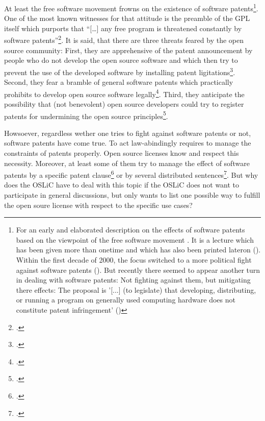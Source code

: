 At least the free software movement frowns on the existence of software
patents\footnote{For an early and elaborated description on the effects of
software patents based on the viewpoint of the free software movement
\cite[see][\nopage wp]{Stallman2001a}. It is a lecture which has been given more
than onetime and which has also been printed lateron (\cite[cf.][\nopage
wp]{Stallman2002a}). Within the first decade of 2000, the focus switched to a
more political fight against software patents (\cite[cf.][\nopage
wp]{Stallman2004a}). But recently there seemed to appear another turn in dealing
with software patents: Not fighting against them, but mitigating there effects:
The proposal is '[...] (to legislate) that developing, distributing, or running
a program on generally used computing hardware does not constitute patent
infringement' (\cite[cf.][\nowpage wp]{Stallman2012a})}. One of the most known
witnesses for that attitude is the preamble of the GPL itself which purports
that \enquote{[\ldots] any free program is threatened constantly by software
patents}\footcite[cf.][wp]{Gpl20OsiLicense1991a}. It is said, that there are
three threats feared by the open source community: First, they are apprehensive
of the patent announcement by people who do not develop the open source software
and which then try to prevent the use of the developed software by installing
patent ligitations\footcite[cf.][234]{JaeMet2011a}. Second, they fear a bramble
of general software patents which practically prohibits to develop open source
software  legally\footcite[cf.][234]{JaeMet2011a}. Third, they anticipate the
possibility that (not benevolent) open source developers could try to register
patents for undermining the open source
principles\footcite[cf.][235]{JaeMet2011a}.

Howsoever, regardless wether one tries to fight against software patents or not,
software patents have come true. To act law-abindingly requires to manage the
constraints of patents properly. Open source licenses know and respect this
necessity. Moreover, at least some of them try to manage the effect of software
patents by a specific patent clause\footcite[pars pro toto cf.][\nopage wp.
§3]{Apl20OsiLicense2004a} or by several distributed sentences\footcite[pars pro
toto cf.][\nopage wp.]{Epl10OsiLicense2005a}. But why does the OSLiC have to
deal with this topic if the OSLiC does not want to participate in general
discussions, but only wants to list one possible way to fulfill the open soure
license with respect to the specific use cases?

